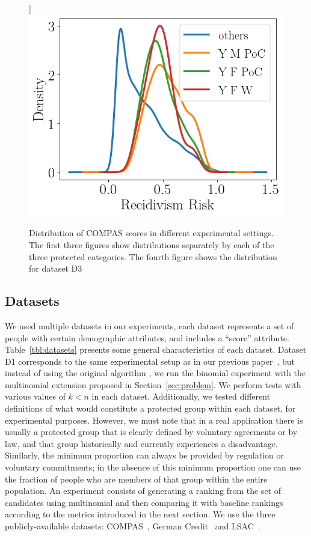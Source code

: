 \begin{figure}[t]
	\label{fig:dataset:compas:worstThree}]
	{\includegraphics[width=.48\textwidth]{pics/compas_worstThreeGroups_kde.png}}\hfill
	\vspace{-3mm}
	\caption{Distribution of COMPAS scores in different experimental settings. The first three figures show distributions separately by each of the three protected categories. The fourth figure shows the distribution for dataset D3}
	\label{fig:dataset:compas}
\end{figure}

\subsection{Datasets}\label{sec:experiments-datasets}

We used multiple datasets in our experiments, each dataset represents a set of people with certain demographic attributes, and includes a ``score'' attribute.
%
Table~\ref{tbl:datasets} presents some general characteristics of each dataset.
%
Dataset D1 corresponds to the same experimental setup as in our previous paper~\cite{zehlike2017fair}, but instead of using the original algorithm \algoFAIR, we run the binomial experiment with the multinomial extension proposed in Section~\ref{sec:problem}.
%
We perform tests with various values of $k<n$ in each dataset.
%
Additionally, we tested different definitions of what would constitute a protected group within each dataset, for experimental purposes.
%
However, we must note that in a real application there is usually a protected group that is clearly defined by voluntary agreements or by law, and that group historically and currently experiences a disadvantage.
%
Similarly, the minimum proportion can always be provided by regulation or voluntary commitments; in the absence of this minimum proportion one can use the fraction of people who are members of that group within the entire population.
%
An experiment consists of generating a ranking from the set of candidates using multinomial \algoFAIR and then comparing it with baseline rankings according to the metrics introduced in the next section.
%
We use the three publicly-available datasets: COMPAS~\cite{angwin_2016_machine}, German Credit~\cite{lichman_2013_uci} and LSAC~\cite{wightman1998lsac}.

